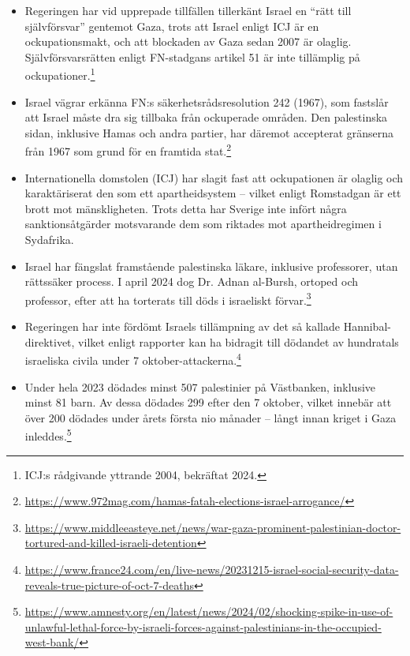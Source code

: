 \begin{itemize}
    \item Regeringen har vid upprepade tillfällen tillerkänt Israel en \enquote{rätt till självförsvar} gentemot Gaza, trots att Israel enligt ICJ är en ockupationsmakt, och att blockaden av Gaza sedan 2007 är olaglig. Självförsvarsrätten enligt FN-stadgans artikel 51 är inte tillämplig på ockupationer.\footnote{ICJ:s rådgivande yttrande 2004, bekräftat 2024.}
    
    \item Israel vägrar erkänna FN:s säkerhetsrådsresolution 242 (1967), som fastslår att Israel måste dra sig tillbaka från ockuperade områden. Den palestinska sidan, inklusive Hamas och andra partier, har däremot accepterat gränserna från 1967 som grund för en framtida stat.\footnote{\url{https://www.972mag.com/hamas-fatah-elections-israel-arrogance/}}
    
    \item Internationella domstolen (ICJ) har slagit fast att ockupationen är olaglig och karaktäriserat den som ett apartheidsystem – vilket enligt Romstadgan är ett brott mot mänskligheten. Trots detta har Sverige inte infört några sanktionsåtgärder motsvarande dem som riktades mot apartheidregimen i Sydafrika.
    
    \item Israel har fängslat framstående palestinska läkare, inklusive professorer, utan rättssäker process. I april 2024 dog Dr. Adnan al-Bursh, ortoped och professor, efter att ha torterats till döds i israeliskt förvar.\footnote{\url{https://www.middleeasteye.net/news/war-gaza-prominent-palestinian-doctor-tortured-and-killed-israeli-detention}}
    
    \item Regeringen har inte fördömt Israels tillämpning av det så kallade Hannibal-direktivet, vilket enligt rapporter kan ha bidragit till dödandet av hundratals israeliska civila under 7 oktober-attackerna.\footnote{\url{https://www.france24.com/en/live-news/20231215-israel-social-security-data-reveals-true-picture-of-oct-7-deaths}}
    
    \item Under hela 2023 dödades minst 507 palestinier på Västbanken, inklusive minst 81 barn. Av dessa dödades 299 efter den 7 oktober, vilket innebär att över 200 dödades under årets första nio månader – långt innan kriget i Gaza inleddes.\footnote{\url{https://www.amnesty.org/en/latest/news/2024/02/shocking-spike-in-use-of-unlawful-lethal-force-by-israeli-forces-against-palestinians-in-the-occupied-west-bank/}}
    

\end{itemize}
